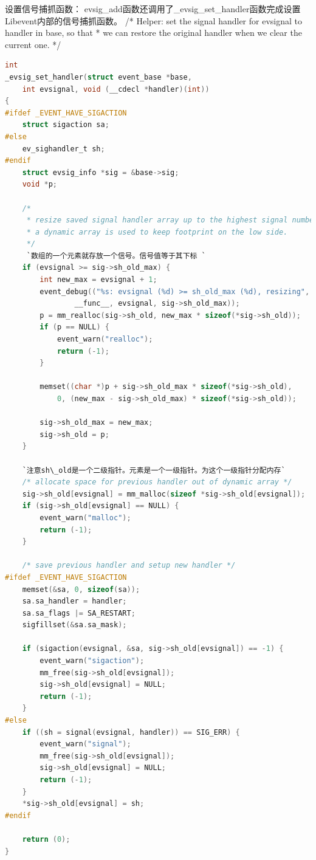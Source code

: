 \documentclass[11pt,a4paper]{article}
\begin{document}
设置信号捕抓函数：
       evsig\_add函数还调用了\_evsig\_set\_handler函数完成设置Libevent内部的信号捕抓函数。
       /* Helper: set the signal handler for evsignal to handler in base, so that
 * we can restore the original handler when we clear the current one. */
\begin{lstlisting}[language=C]
int
_evsig_set_handler(struct event_base *base,
    int evsignal, void (__cdecl *handler)(int))
{
#ifdef _EVENT_HAVE_SIGACTION
	struct sigaction sa;
#else
	ev_sighandler_t sh;
#endif
	struct evsig_info *sig = &base->sig;
	void *p;

	/*
	 * resize saved signal handler array up to the highest signal number.
	 * a dynamic array is used to keep footprint on the low side.
	 */
	 `数组的一个元素就存放一个信号。信号值等于其下标 `
	if (evsignal >= sig->sh_old_max) {
		int new_max = evsignal + 1;
		event_debug(("%s: evsignal (%d) >= sh_old_max (%d), resizing",
			    __func__, evsignal, sig->sh_old_max));
		p = mm_realloc(sig->sh_old, new_max * sizeof(*sig->sh_old));
		if (p == NULL) {
			event_warn("realloc");
			return (-1);
		}

		memset((char *)p + sig->sh_old_max * sizeof(*sig->sh_old),
		    0, (new_max - sig->sh_old_max) * sizeof(*sig->sh_old));

		sig->sh_old_max = new_max;
		sig->sh_old = p;
	}

	`注意sh\_old是一个二级指针。元素是一个一级指针。为这个一级指针分配内存`
	/* allocate space for previous handler out of dynamic array */
	sig->sh_old[evsignal] = mm_malloc(sizeof *sig->sh_old[evsignal]);
	if (sig->sh_old[evsignal] == NULL) {
		event_warn("malloc");
		return (-1);
	}

	/* save previous handler and setup new handler */
#ifdef _EVENT_HAVE_SIGACTION
	memset(&sa, 0, sizeof(sa));
	sa.sa_handler = handler;
	sa.sa_flags |= SA_RESTART;
	sigfillset(&sa.sa_mask);

	if (sigaction(evsignal, &sa, sig->sh_old[evsignal]) == -1) {
		event_warn("sigaction");
		mm_free(sig->sh_old[evsignal]);
		sig->sh_old[evsignal] = NULL;
		return (-1);
	}
#else
	if ((sh = signal(evsignal, handler)) == SIG_ERR) {
		event_warn("signal");
		mm_free(sig->sh_old[evsignal]);
		sig->sh_old[evsignal] = NULL;
		return (-1);
	}
	*sig->sh_old[evsignal] = sh;
#endif

	return (0);
}
\end{lstlisting}
\end{document}
